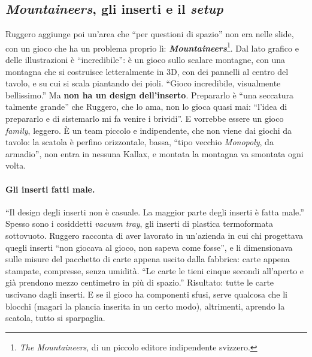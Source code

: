 \subsection{\emph{Mountaineers}, gli inserti e il \emph{setup}}
\label{a10:sec:inserti}

Ruggero aggiunge poi un'area che ``per questioni di spazio'' non era nelle slide, con un
gioco che ha un problema proprio lì: \textbf{\emph{Mountaineers}}\footnote{\emph{The
Mountaineers}, di un piccolo editore indipendente svizzero.}. Dal lato grafico e
delle illustrazioni è ``incredibile'': è un gioco sullo scalare montagne, con una
montagna che si costruisce letteralmente in 3D, con dei pannelli al centro del tavolo, e
su cui si scala piantando dei pioli. ``Gioco incredibile, visualmente bellissimo.'' Ma
\textbf{non ha un design dell'inserto}. Prepararlo è ``una seccatura talmente grande'' che
Ruggero, che lo ama, non lo gioca quasi mai: ``l'idea di prepararlo e di sistemarlo mi
fa venire i brividi''. E vorrebbe essere un gioco \emph{family}, leggero. È un team piccolo
e indipendente, che non viene dai giochi da tavolo: la scatola è perfino orizzontale,
bassa, ``tipo vecchio \emph{Monopoly}, da armadio'', non entra in nessuna Kallax, e
montata la montagna va smontata ogni volta.

\paragraph{Gli inserti fatti male.} ``Il design degli inserti non è casuale. La
maggior parte degli inserti è fatta male.'' Spesso sono i cosiddetti \emph{vacuum tray},
gli inserti di plastica termoformata sottovuoto. Ruggero racconta di aver lavorato in
un'azienda in cui chi progettava quegli inserti ``non giocava al gioco, non sapeva come
fosse'', e li dimensionava sulle misure del pacchetto di carte appena uscito dalla
fabbrica: carte appena stampate, compresse, senza umidità. ``Le carte le tieni cinque
secondi all'aperto e già prendono mezzo centimetro in più di spazio.'' Risultato: tutte le
carte uscivano dagli inserti. E se il gioco ha componenti sfusi, serve qualcosa che li
blocchi (magari la plancia inserita in un certo modo), altrimenti, aprendo la scatola,
tutto si sparpaglia.

